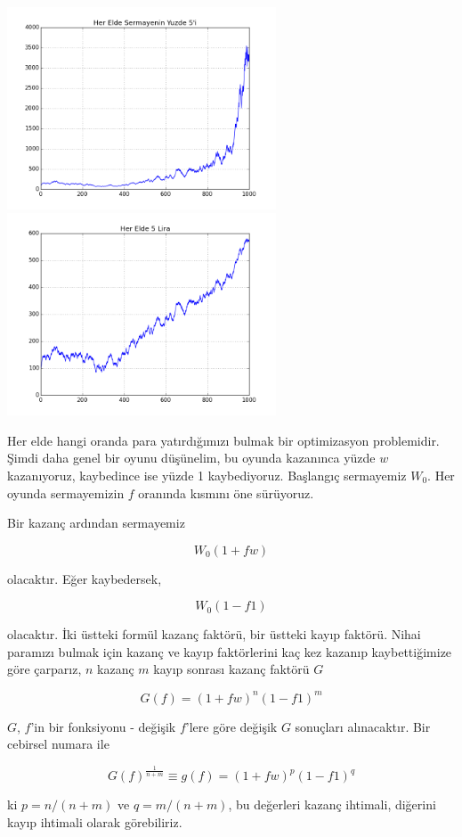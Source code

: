 \documentclass[12pt,fleqn]{article}\usepackage{../../common}
\begin{document}
\includegraphics[height=6cm]{tser_kelly_01.png}
\includegraphics[height=6cm]{tser_kelly_02.png}

Her elde hangi oranda para yatırdığımızı bulmak bir optimizasyon problemidir.
Şimdi daha genel bir oyunu düşünelim, bu oyunda kazanınca yüzde $w$
kazanıyoruz, kaybedince ise yüzde 1 kaybediyoruz. Başlangıç sermayemiz
$W_0$. Her oyunda sermayemizin $f$ oranında kısmını öne sürüyoruz.

Bir kazanç ardından sermayemiz 

$$ W_0(1+fw) $$

olacaktır. Eğer kaybedersek,

$$ W_0(1-f 1) $$

olacaktır. İki üstteki formül kazanç faktörü, bir üstteki kayıp
faktörü. Nihai paramızı bulmak için kazanç ve kayıp faktörlerini kaç kez
kazanıp kaybettiğimize göre çarparız, $n$ kazanç $m$ kayıp sonrası kazanç
faktörü $G$

$$ G(f) = (1+fw)^n(1-f1)^m $$

$G$, $f$'in bir fonksiyonu - değişik $f$'lere göre değişik $G$ sonuçları
alınacaktır. Bir cebirsel numara ile

$$ G(f)^{\frac{1}{n+m}} \equiv g(f) = (1+fw)^p(1-f1)^q $$

ki $p = n/(n+m)$ ve $q=m/(n+m)$, bu değerleri kazanç ihtimali, diğerini
kayıp ihtimali olarak görebiliriz. 
\end{document}
